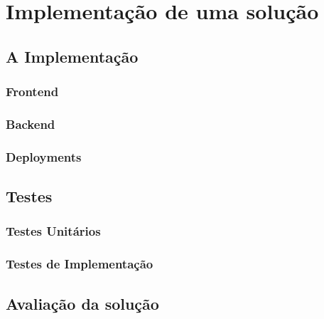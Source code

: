 \chapter{Implementação de uma solução}

\section{A Implementação}

\subsection{}

\subsection{Frontend}

\subsection{Backend}

\subsection{Deployments}



\section{Testes}

\subsection{Testes Unitários}

\subsection{Testes de Implementação}

\section{Avaliação da solução}